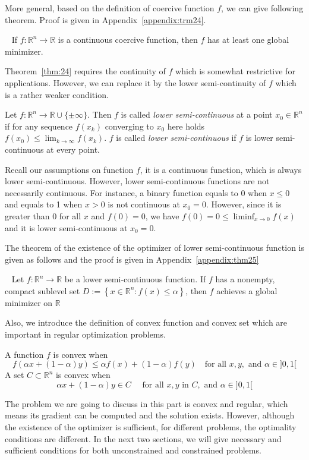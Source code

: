 More general, based on the definition of coercive function $f$, we can give following theorem. Proof is given in Appendix~\ref{appendix:trm24}.
\begin{thm}~\citep{JS:06}
    \label{thm:24}
    If $f: \mathbb{R}^{n} \rightarrow \mathbb{R}$ is a continuous coercive function, then $f$ has at least one global minimizer.
\end{thm}
Theorem~\ref{thm:24} requires the continuity of $f$ which is somewhat restrictive for applications. However, we can replace it by the lower semi-continuity of $f$ which is a rather weaker condition. 
\begin{defn}
    Let $f: \mathbb{R}^{n} \rightarrow \mathbb{R} \cup\{\pm \infty\}$. Then $f$ is called \emph{lower semi-continuous} at a point $x_0 \in \mathbb{R}^n$ if for any sequence $f\left(x_{k}\right)$ converging to $x_0$ here holds $f\left(x_{0}\right) \leq \lim _{k \rightarrow \infty} f\left(x_{k}\right)$. $f$ is called \emph{lower semi-continuous} if $f$ is lower semi-continuous at every point.
\end{defn}
Recall our assumptions on function $f$, it is a continuous function, which is always lower semi-continuous. However, lower semi-continuous functions are not necessarily continuous. For instance, a binary function equals to 0 when $x \leq 0$ and equals to 1 when $x > 0$ is not continuous at $x_0 = 0$. However, since it is greater than 0 for all $x$ and $f(0) = 0$, we have $f(0)=0 \leq \liminf _{x \rightarrow 0} f(x)$ and it is lower semi-continuous at $x_0 = 0$.
\par The theorem of the existence of the optimizer of lower semi-continuous function is given as follows and the proof is given in Appendix~\ref{appendix:thm25}
\begin{thm}~\citep{JS:06}
    \label{thm:25}
    Let $f: \mathbb{R}^{n} \rightarrow \mathbb{R}$ be a lower semi-continuous function. If $f$ has a nonempty, compact sublevel set $D:=\left\{x \in \mathbb{R}^{n}: f(x) \leq \alpha\right\}$, then $f$ achieves a global minimizer on $\mathbb{R}$
\end{thm}
Also, we introduce the definition of convex function and convex set which are important in regular optimization problems.
\begin{defn}
    A function $f$ is convex when 
    $$
        f(\alpha x+(1-\alpha) y) \leq \alpha f(x)+(1-\alpha) f(y) \quad \textrm{for all } x, y, \textrm{ and } \alpha \in ]0,1[
    $$
    A set $C \subset \mathbb{R}^n$ is convex when 
    $$
    \alpha x+(1-\alpha) y \in C \quad \textrm { for all } x, y \textrm { in } C, \textrm{ and } \alpha \in ] 0,1[
    $$
\end{defn}
The problem we are going to discuss in this part is convex and regular, which means its gradient can be computed and the solution exists. However, although the existence of the optimizer is sufficient, for different problems, the optimality conditions are different. In the next two sections, we will give necessary and sufficient conditions for both unconstrained and constrained problems.


